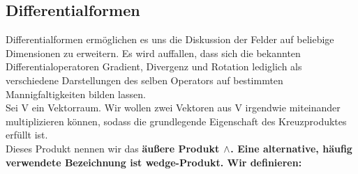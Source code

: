 \subsection{Differentialformen}
Differentialformen ermöglichen es uns die Diskussion der Felder auf beliebige Dimensionen zu erweitern. Es wird auffallen, dass sich die bekannten Differentialoperatoren Gradient, Divergenz und Rotation lediglich als verschiedene Darstellungen des selben Operators auf bestimmten Mannigfaltigkeiten bilden lassen. \\
Sei V ein Vektorraum. Wir wollen zwei Vektoren aus V irgendwie miteinander multiplizieren können, sodass die grundlegende Eigenschaft des Kreuzproduktes erfüllt ist. \\
Dieses Produkt nennen wir das \bfseries äußere Produkt \normalfont $\wedge$. Eine alternative, häufig verwendete Bezeichnung ist \bfseries wedge-Produkt. \normalfont
Wir definieren: \\